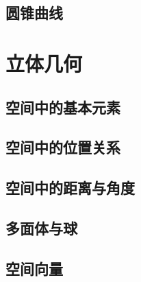 \documentclass[lang=cn, zihao=4.5]{elegantbook}
\begin{document}
\section{圆锥曲线}

\chapter{立体几何}

\section{空间中的基本元素}

\section{空间中的位置关系}

\section{空间中的距离与角度}

\section{多面体与球}

\section{空间向量}
\end{document}
